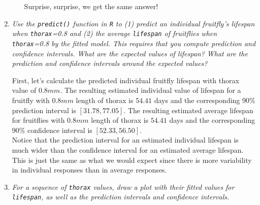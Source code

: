 \documentclass[12pt,letterpaper]{article}
\begin{document}
\begin{enumerate}[label=(\alph*)]
\begin{itemize}
		Surprise, surprise, we get the same answer!
					\vspace{.15cm}
					  
					
	\end{itemize}
			\vspace{6cm}
	\item \emph{Use the \texttt{predict()} function in \texttt{R} to (1) predict an individual fruitfly's lifespan when \texttt{thorax}=0.8 and (2) the average \texttt{lifespan} of fruitflies when \texttt{thorax}=0.8 by the fitted model. This requires that you compute prediction and confidence intervals. What are the expected values of lifespan? What are the prediction and confidence intervals around the expected values? }
	
		\vspace{.15cm}
	  
			\vspace{.15cm}
First, let's calculate the predicted individual fruitfly lifespan with thorax value of $0.8 mm$. The resulting estimated individual value of lifespan for a fruitfly with $0.8 mm$ length of thorax is $54.41$ days and the corresponding 90\% prediction interval is $[31.78, 77.05]$. The resulting estimated average lifespan for fruitflies with $0.8 mm$ length of thorax is $54.41$ days and the corresponding 90\% confidence interval is $[52.33, 56.50]$. \\

Notice that the prediction interval for an estimated individual lifespan is much wider than the confidence interval for an estimated average lifespan. This is just the same as what we would expect since there is more variability in individual responses than in average responses. 
		\vspace{.25cm}

	\item\emph{	For a sequence of \texttt{thorax} values, draw a plot with their fitted values for \texttt{lifespan}, as well as the prediction intervals and confidence intervals.}
	  


\end{enumerate}
\end{document}
